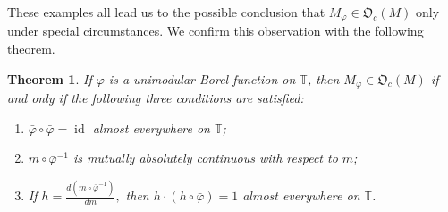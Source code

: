 \documentclass{dis}
\theoremstyle{plain}
\newtheorem{Theorem}[equation]{Theorem}
\theoremstyle{definition}
\def\T{\mathbb{T}}
\renewcommand{\phi}{\varphi}
\newcommand{\0}{{\color{lightgray}0}}
\begin{document}
These examples all lead us to the possible conclusion that $M_{\phi} \in \mathfrak{O}_c(M)$ only under special circumstances. We confirm this observation with the following theorem.

\begin{Theorem}\label{thmmainmult}
If $\phi$ is a unimodular Borel function on $\T$, then $M_{\phi} \in \mathfrak{O}_c(M)$ if and only if the following three conditions are satisfied:
\begin{enumerate}
\item $\bar \phi \circ  \bar \phi = \operatorname{id}$ almost everywhere on $\T$;
\item $m \circ \bar \phi^{-1}$ is mutually absolutely continuous with respect to $m$;
\item If 
${\displaystyle h = \frac{d (m \circ \bar \phi^{-1})}{dm},}$
then $h \cdot (h \circ \bar \phi) = 1$ almost everywhere on $\T$.
\end{enumerate}
\end{Theorem}
\end{document}
